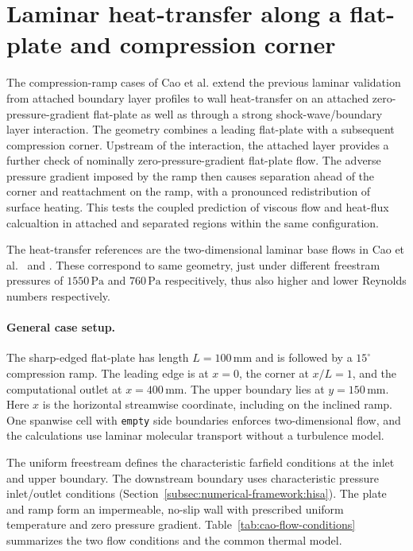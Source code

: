 \section{Laminar heat-transfer along a flat-plate and compression corner}
\label{sec:numerical-vv:laminar-heat-transfer-compression-corner}

The compression-ramp cases of Cao et al. extend the previous laminar validation from
attached boundary layer profiles to wall heat-transfer on an attached zero-pressure-gradient flat-plate as well as through a strong shock-wave/boundary layer interaction. The geometry combines a leading flat-plate with a subsequent compression corner. Upstream of the interaction, the attached layer provides a further check of nominally zero-pressure-gradient flat-plate
flow. The adverse pressure gradient imposed by the ramp then causes separation ahead of the corner and reattachment on the ramp, with a pronounced redistribution of surface heating. This tests the coupled prediction of viscous flow and heat-flux calcualtion in attached and separated
regions within the same configuration.
\par\medskip

The heat-transfer references are the two-dimensional laminar base flows in
Cao et al.~\citep[Fig.~4(b)]{Cao2022TransitionIntrinsicInstability} and
\citet[Fig.~8(a), sharp-edge case R0]{Cao2021LeadingEdgeBluntness}.
These correspond to same geometry, just under different freestram pressures of \(1550\,\mathrm{Pa}\) and \(760\,\mathrm{Pa}\) respecitively, thus also higher and lower Reynolds numbers respectively.

\paragraph{General case setup.}

The sharp-edged flat-plate has length \(L=100\,\mathrm{mm}\) and is
followed by a \(15^\circ\) compression ramp. The leading edge is at
\(x=0\), the corner at \(x/L=1\), and the computational outlet at
\(x=400\,\mathrm{mm}\). The upper boundary lies at
\(y=150\,\mathrm{mm}\). Here \(x\) is the horizontal streamwise
coordinate, including on the inclined ramp. One spanwise cell with
\texttt{empty} side boundaries enforces two-dimensional flow, and the
calculations use laminar molecular transport without a turbulence model.
\par\medskip

The uniform freestream defines the characteristic farfield conditions at
the inlet and upper boundary. The downstream boundary uses characteristic
pressure inlet/outlet conditions (Section~\ref{subsec:numerical-framework:hisa}). The plate and
ramp form an impermeable, no-slip wall with prescribed uniform temperature
and zero pressure gradient. Table~\ref{tab:cao-flow-conditions}
summarizes the two flow conditions and the common thermal model.

